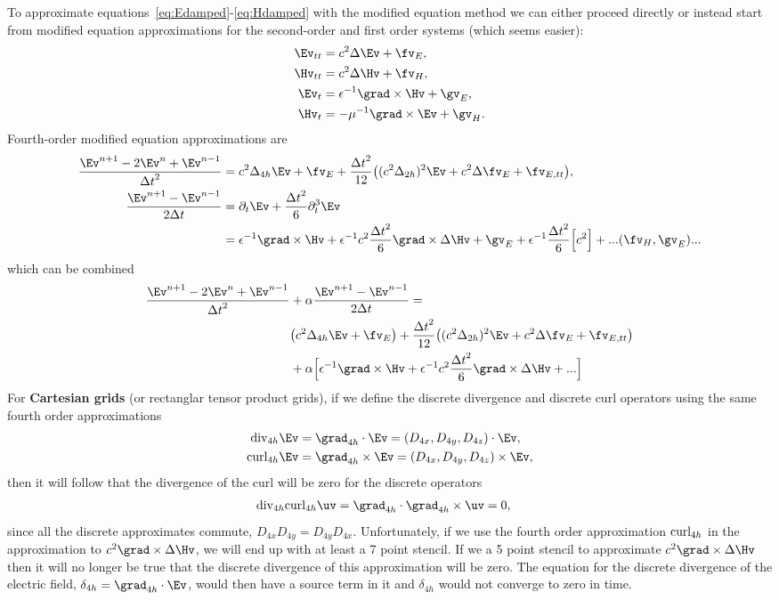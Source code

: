 To approximate equations~\eqref{eq:Edamped}-\eqref{eq:Hdamped} with the modified equation method
we can either proceed directly or instead start from modified equation approximations for the
second-order and first order systems (which seems easier):
\begin{align}
   \Ev_{tt} & = c^2 \Delta \Ev + \fv_E , \\
   \Hv_{tt} & = c^2 \Delta \Hv + \fv_H ,\\
   \Ev_t &= \eps^{-1} \grad\times \Hv +\gv_E, \\
   \Hv_t &= -\mu^{-1} \grad\times \Ev +\gv_H .
\end{align}
Fourth-order modified equation approximations are 
\begin{align}
 { \Ev^{n+1} -2 \Ev ^n + \Ev^{n-1}\over  \dt^2} &= c^2 \Delta_{4h} \Ev + \fv_E 
                    + {\dt^2\over 12} \big( (c^2 \Delta_{2h})^2 \Ev + c^2 \Delta \fv_E  + \fv_{E,tt} \big), \\
 {\Ev^{n+1} - \Ev^{n-1} \over 2\dt } &=  \partial_t \Ev + {\dt^2\over 6} \partial_t^3 \Ev \\
          &= \eps^{-1}\grad\times\Hv + \eps^{-1} c^2 {\dt^2\over 6} \grad\times\Delta\Hv 
        + \gv_E + \eps^{-1}{\dt^2\over 6}\Big[ c^2  \Big]   + ...(\fv_H,\gv_E) ...
\end{align}
which can be combined
\begin{align}
 { \Ev^{n+1} -2 \Ev ^n + \Ev^{n-1}\over  \dt^2} &+ \alpha {\Ev^{n+1} - \Ev^{n-1} \over 2\dt } = \\
 & \big(c^2 \Delta_{4h} \Ev + \fv_E \big) + {\dt^2\over 12} \big( (c^2 \Delta_{2h})^2 \Ev 
                                                     + c^2 \Delta \fv_E  + \fv_{E,tt} \big) \\
 & + \alpha\Big[ \eps^{-1}\grad\times\Hv + \eps^{-1} c^2 {\dt^2\over 6} \grad\times\Delta\Hv + ... \Big] 
\end{align}
%
For {\bf Cartesian grids} (or rectanglar tensor product grids), if we define the
discrete divergence and discrete curl operators using the same fourth order
approximations
\begin{align}
  {\rm div}_{4h} \Ev &= \grad_{4h} \cdot \Ev = (D_{4x},D_{4y},D_{4z})\cdot\Ev, \\
  {\rm curl}_{4h} \Ev &= \grad_{4h} \times \Ev = (D_{4x},D_{4y},D_{4z})\times\Ev,
\end{align}
then it will follow that the divergence of the curl will be zero for the discrete operators
\begin{align}
   {\rm div}_{4h}{\rm curl}_{4h} \uv &= \grad_{4h} \cdot  \grad_{4h} \times \uv =0 ,
\end{align}
since all the discrete approximates commute, $D_{4x}D_{4y}=D_{4y}D_{4x}$.
Unfortunately, 
if we use the fourth order approximation ${\rm curl}_{4h}$ in the approximation to $c^2\grad\times\Delta\Hv$,
we will end up with at least a 7 point stencil. If we a 5 point stencil to approximate $c^2\grad\times\Delta\Hv$
then it will no longer be true that the discrete divergence of this approximation will be zero. The equation
for the discrete divergence of the electric field, $\delta_{4h}=\grad_{4h} \cdot \Ev$, 
would then have a source term in it and $\delta_{4h}$ would not 
converge to zero in time. 

